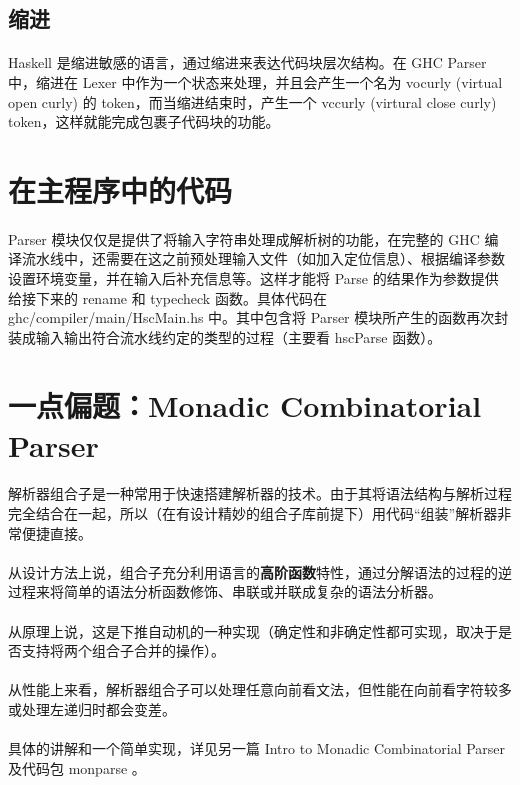 \documentclass{article}
\begin{document}
	\subsection{缩进}
	\paragraph{}
	Haskell 是缩进敏感的语言，通过缩进来表达代码块层次结构。在 GHC Parser 中，缩进在 Lexer 中作为一个状态来处理，并且会产生一个名为 vocurly (virtual open curly) 的 token，而当缩进结束时，产生一个 vccurly (virtural close curly) token，这样就能完成包裹子代码块的功能。
	
	\section{在主程序中的代码}
	\paragraph{}
	Parser 模块仅仅是提供了将输入字符串处理成解析树的功能，在完整的 GHC 编译流水线中，还需要在这之前预处理输入文件（如加入定位信息）、根据编译参数设置环境变量，并在输入后补充信息等。这样才能将 Parse 的结果作为参数提供给接下来的 rename 和 typecheck 函数。具体代码在 ghc/compiler/main/HscMain.hs 中。其中包含将 Parser 模块所产生的函数再次封装成输入输出符合流水线约定的类型的过程（主要看 hscParse 函数）。
	
	\section{ 一点偏题：Monadic Combinatorial Parser }
	\paragraph{}
	解析器组合子\cite{Hutton96monadicparser}是一种常用于快速搭建解析器的技术。由于其将语法结构与解析过程完全结合在一起，所以（在有设计精妙的组合子库\cite{parsec}前提下）用代码“组装”解析器非常便捷直接。
	\paragraph{}
	从设计方法上说，组合子充分利用语言的\textbf{高阶函数}特性，通过分解语法的过程的逆过程来将简单的语法分析函数修饰、串联或并联成复杂的语法分析器。
	\paragraph{}
	从原理上说，这是下推自动机的一种实现（确定性和非确定性都可实现，取决于是否支持将两个组合子合并的操作）。
	\paragraph{}
	从性能上来看，解析器组合子可以处理任意向前看文法，但性能在向前看字符较多或处理左递归时都会变差\cite{Frost07parsercombinators}。
	\paragraph{}
	具体的讲解和一个简单实现，详见另一篇 Intro to Monadic Combinatorial Parser 及代码包 monparse 。
 	
 	\medskip
	
	
\end{document}
